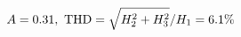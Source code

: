 \documentclass[preview]{standalone}
\begin{document}
\begin{align*}
\special{dvisvgm:raw <g id='unique000'>}A=0.31,\ \text{THD}=\sqrt{H_2^2+H_3^2}/H_1=6.1\%\special{dvisvgm:raw </g>}
\end{align*}
\end{document}
